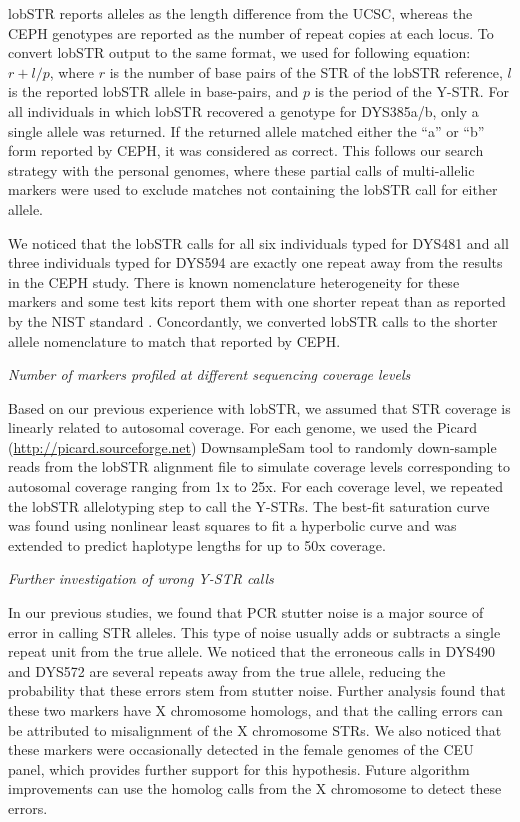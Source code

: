 lobSTR reports alleles as the length difference from the UCSC, whereas the CEPH genotypes are reported as the number of repeat copies at each locus. To convert lobSTR output to the same format, we used for following equation: $r+l/p$, where $r$ is the number of base pairs of the STR of the lobSTR reference, $l$ is the reported lobSTR allele in base-pairs, and $p$ is the period of the Y-STR. For all individuals in which lobSTR recovered a genotype for DYS385a/b, only a single allele was returned. If the returned allele matched either the ``a'' or ``b'' form reported by CEPH, it was considered as correct. This follows our search strategy with the personal genomes, where these partial calls of multi-allelic markers were used to exclude matches not containing the lobSTR call for either allele. 

We noticed that the lobSTR calls for all six individuals typed for DYS481 and all three individuals typed for DYS594 are exactly one repeat away from the results in the CEPH study. There is known nomenclature heterogeneity for these markers and some test kits report them with one shorter repeat than as reported by the NIST standard . Concordantly, we converted lobSTR calls to the shorter allele nomenclature to match that reported by CEPH.

\emph{Number of markers profiled at different sequencing coverage levels}

Based on our previous experience with lobSTR, we assumed that STR coverage is linearly related to autosomal coverage. For each genome, we used the Picard (\url{http://picard.sourceforge.net}) DownsampleSam tool to randomly down-sample reads from the lobSTR alignment file to simulate coverage levels corresponding to autosomal coverage ranging from 1x to 25x. For each coverage level, we repeated the lobSTR allelotyping step to call the Y-STRs. The best-fit saturation curve was found using nonlinear least squares to fit a hyperbolic curve and was extended to predict haplotype lengths for up to 50x coverage.

\emph{Further investigation of wrong Y-STR calls}

In our previous studies, we found that PCR stutter noise is a major source of error in calling STR alleles. This type of noise usually adds or subtracts a single repeat unit from the true allele. We noticed that the erroneous calls in DYS490 and DYS572 are several repeats away from the true allele, reducing the probability that these errors stem from stutter noise. Further analysis found that these two markers have X chromosome homologs, and that the calling errors can be attributed to misalignment of the X chromosome STRs. We also noticed that these markers were occasionally detected in the female genomes of the CEU panel, which provides further support for this hypothesis. Future algorithm improvements can use the homolog calls from the X chromosome to detect these errors.

